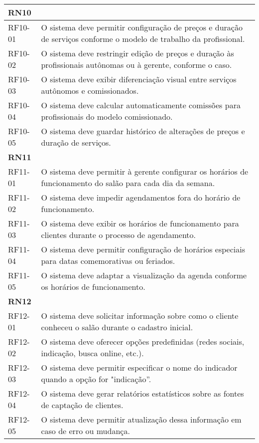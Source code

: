 \begin{longtable}{|p{}|p{}|}
	\multicolumn{2}{|l|}{\textbf{RN10}} \\ \hline
	RF10-01 & O sistema deve permitir configuração de preços e duração de serviços conforme o modelo de trabalho da profissional. \\ \hline
	RF10-02 & O sistema deve restringir edição de preços e duração às profissionais autônomas ou à gerente, conforme o caso. \\ \hline
	RF10-03 & O sistema deve exibir diferenciação visual entre serviços autônomos e comissionados. \\ \hline
	RF10-04 & O sistema deve calcular automaticamente comissões para profissionais do modelo comissionado. \\ \hline
	RF10-05 & O sistema deve guardar histórico de alterações de preços e duração de serviços. \\ \hline
	
	\multicolumn{2}{|l|}{\textbf{RN11}} \\ \hline
	RF11-01 & O sistema deve permitir à gerente configurar os horários de funcionamento do salão para cada dia da semana. \\ \hline
	RF11-02 & O sistema deve impedir agendamentos fora do horário de funcionamento. \\ \hline
	RF11-03 & O sistema deve exibir os horários de funcionamento para clientes durante o processo de agendamento. \\ \hline
	RF11-04 & O sistema deve permitir configuração de horários especiais para datas comemorativas ou feriados. \\ \hline
	RF11-05 & O sistema deve adaptar a visualização da agenda conforme os horários de funcionamento. \\ \hline
	
	\multicolumn{2}{|l|}{\textbf{RN12}} \\ \hline
	RF12-01 & O sistema deve solicitar informação sobre como o cliente conheceu o salão durante o cadastro inicial. \\ \hline
	RF12-02 & O sistema deve oferecer opções predefinidas (redes sociais, indicação, busca online, etc.). \\ \hline
	RF12-03 & O sistema deve permitir especificar o nome do indicador quando a opção for "indicação”. \\ \hline
	RF12-04 & O sistema deve gerar relatórios estatísticos sobre as fontes de captação de clientes. \\ \hline
	RF12-05 & O sistema deve permitir atualização dessa informação em caso de erro ou mudança. \\ \hline
	

\end{longtable}
